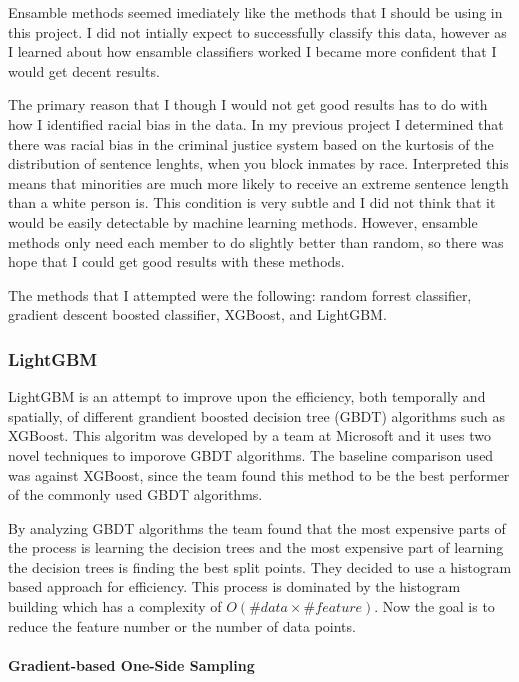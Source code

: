 \documentclass[11pt]{article}
\begin{document}
Ensamble methods seemed imediately like the methods that I should be
using in this project. I did not intially expect to successfully
classify this data, however as I learned about how ensamble classifiers
worked I became more confident that I would get decent results.

The primary reason that I though I would not get good results has to do
with how I identified racial bias in the data. In my previous project I
determined that there was racial bias in the criminal justice system
based on the kurtosis of the distribution of sentence lenghts, when you
block inmates by race. Interpreted this means that minorities are much
more likely to receive an extreme sentence length than a white person
is. This condition is very subtle and I did not think that it would be
easily detectable by machine learning methods. However, ensamble methods
only need each member to do slightly better than random, so there was
hope that I could get good results with these methods.

The methods that I attempted were the following: random forrest
classifier, gradient descent boosted classifier, XGBoost, and LightGBM.

    \hypertarget{lightgbm}{%
\subsubsection{LightGBM}\label{lightgbm}}

LightGBM is an attempt to improve upon the efficiency, both temporally
and spatially, of different grandient boosted decision tree (GBDT)
algorithms such as XGBoost. This algoritm was developed by a team at
Microsoft and it uses two novel techniques to imporove GBDT algorithms.
The baseline comparison used was against XGBoost, since the team found
this method to be the best performer of the commonly used GBDT
algorithms.

By analyzing GBDT algorithms the team found that the most expensive
parts of the process is learning the decision trees and the most
expensive part of learning the decision trees is finding the best split
points. They decided to use a histogram based approach for efficiency.
This process is dominated by the histogram building which has a
complexity of \(O(\#data \times \#feature)\). Now the goal is to reduce
the feature number or the number of data points.

\hypertarget{gradient-based-one-side-sampling}{%
\paragraph{Gradient-based One-Side
Sampling}\label{gradient-based-one-side-sampling}}
\end{document}

